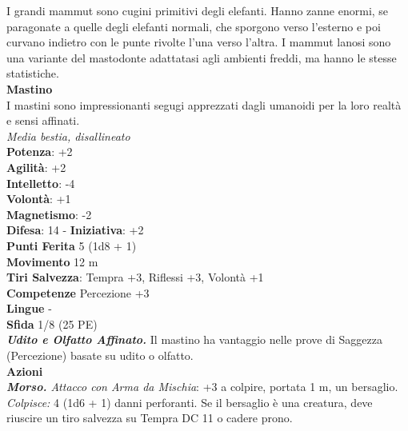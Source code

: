 \begin{multicols}{2}
I grandi mammut sono cugini primitivi degli elefanti. Hanno zanne enormi, se paragonate a quelle degli elefanti normali, che sporgono verso l’esterno e poi curvano indietro con le punte rivolte l’una verso l’altra. I mammut lanosi sono una variante del mastodonte adattatasi agli ambienti freddi, ma hanno le stesse statistiche. \\

\medskip\textbf{Mastino}\\
I mastini sono impressionanti segugi apprezzati dagli umanoidi per la loro realtà e sensi affinati.\\
\emph{Media bestia, disallineato}\\
\textbf{Potenza}: +2\\
\textbf{Agilità}: +2\\
\textbf{Intelletto}: -4\\
\textbf{Volontà}: +1\\
\textbf{Magnetismo}: -2\\
\textbf{Difesa}: 14 - \textbf{Iniziativa}: +2\\
\textbf{Punti Ferita} 5 (1d8 + 1)\\
\textbf{Movimento} 12 m\\
\textbf{Tiri Salvezza}: Tempra +3, Riflessi +3, Volontà +1 \\
\textbf{Competenze} Percezione +3\\
\textbf{Lingue} -\\
\textbf{Sfida} 1/8 (25 PE)\smallskip\\
\emph{\textbf{Udito e Olfatto Affinato.}} Il mastino ha vantaggio nelle prove di Saggezza (Percezione) basate su udito o olfatto.\\
\smallskip\textbf{Azioni}\\
\emph{\textbf{Morso.} Attacco con Arma da Mischia}: +3 a colpire, portata 1 m, un bersaglio.\\
\emph{Colpisce:} 4 (1d6 + 1) danni perforanti. Se il bersaglio è una creatura, deve riuscire un tiro salvezza su Tempra DC 11 o cadere prono.\\


\end{multicols}
